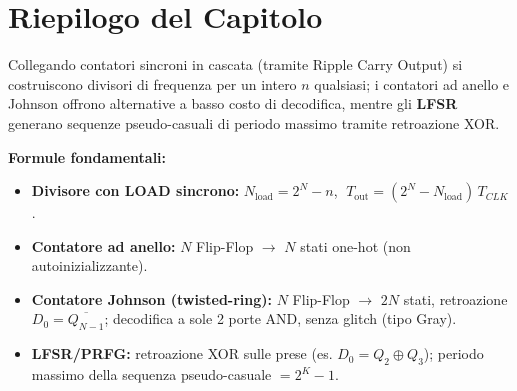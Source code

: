 \section*{Riepilogo del Capitolo}

\begin{important}
Collegando contatori sincroni in cascata (tramite Ripple Carry Output) si costruiscono divisori di frequenza per un intero $n$ qualsiasi; i contatori ad anello e Johnson offrono alternative a basso costo di decodifica, mentre gli \textbf{LFSR} generano sequenze pseudo-casuali di periodo massimo tramite retroazione XOR.
\end{important}

\begin{note}
\textbf{Formule fondamentali:}
\begin{itemize}
    \item \textbf{Divisore con LOAD sincrono:} $N_{\text{load}} = 2^N - n$, $\; T_{\text{out}} = (2^N - N_{\text{load}})\,T_{CLK}$.
    \item \textbf{Contatore ad anello:} $N$ Flip-Flop $\to$ $N$ stati one-hot (non autoinizializzante).
    \item \textbf{Contatore Johnson (twisted-ring):} $N$ Flip-Flop $\to$ $2N$ stati, retroazione $D_0 = \overline{Q_{N-1}}$; decodifica a sole 2 porte AND, senza glitch (tipo Gray).
    \item \textbf{LFSR/PRFG:} retroazione XOR sulle prese (es. $D_0 = Q_2 \oplus Q_3$); periodo massimo della sequenza pseudo-casuale $= 2^K-1$.
\end{itemize}
\end{note}

